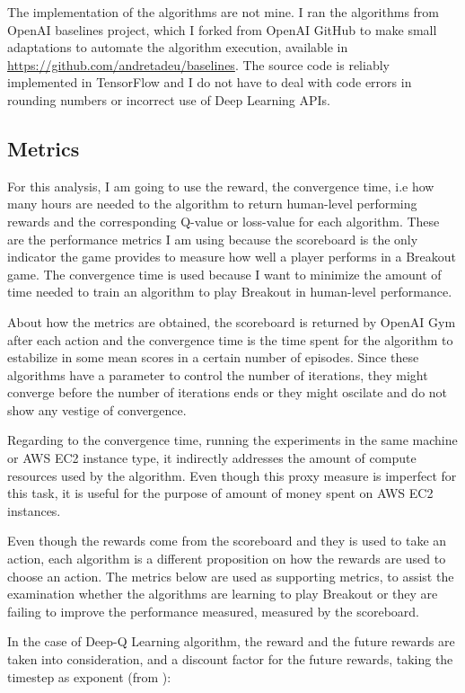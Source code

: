 \documentclass[11pt,twoside,a4paper]{article}
\begin{document}
The implementation of the algorithms are not mine. I ran the algorithms from
OpenAI baselines\cite{baselines} project, which I forked from OpenAI GitHub to make small
adaptations to automate the algorithm execution, available in
\url{https://github.com/andretadeu/baselines}. The source code is reliably
implemented in TensorFlow and I do not have to deal with code errors in
rounding numbers or incorrect use of Deep Learning APIs.

\subsection*{Metrics}

For this analysis, I am going to use the reward, the convergence time,
i.e how many hours are needed to the algorithm to return human-level performing
rewards and the corresponding Q-value or loss-value for each algorithm. These
are the performance metrics I am using because the scoreboard is the only
indicator the game provides to measure how well a player performs in a Breakout
game. The convergence time is used because I want to minimize the amount of time
needed to train an algorithm to play Breakout in human-level performance.

About how the metrics are obtained, the scoreboard is returned by OpenAI Gym
after each action and the convergence time is the time spent for the algorithm
to estabilize in some mean scores in a certain number of episodes. Since these
algorithms have a parameter to control the number of iterations, they might
converge before the number of iterations ends or they might oscilate and do not
show any vestige of convergence.

Regarding to the convergence time, running the experiments in the same machine
or AWS EC2 instance type, it indirectly addresses the amount of compute
resources used by the algorithm. Even though this proxy measure is imperfect for
this task, it is useful for the purpose of amount of money spent on AWS EC2
instances.

Even though the rewards come from the scoreboard and they is used to take an
action, each algorithm is a different proposition on how the rewards are used to
choose an action. The metrics below are used as supporting metrics,
to assist the examination whether the algorithms are learning to play Breakout
or they are failing to improve the performance measured, measured by the
scoreboard.

In the case of Deep-Q Learning algorithm, the reward and the future rewards are
taken into consideration, and a discount factor for the future rewards, taking
the timestep as exponent (from \cite{mnih2015humanlevel}):
\end{document}
